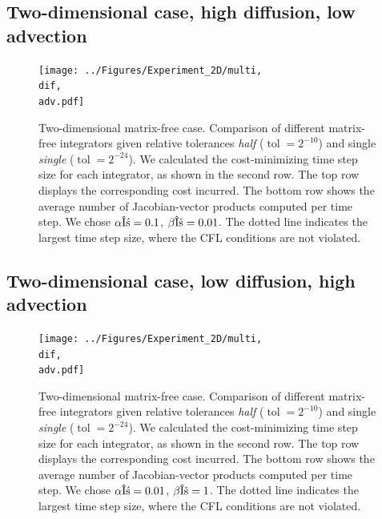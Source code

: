 \documentclass{scrartcl}
\begin{document}
\subsection*{Two-dimensional case, high diffusion, low advection}
\begin{figure}[H]
	\newcommand{\dif}{\detokenize{α}=0.1}
	\newcommand{\adv}{\detokenize{β}=0.01}
	\centering
	\texttt{[image: ../Figures/Experiment\_2D/multi, \\dif, \\adv.pdf]}
	\caption{Two-dimensional matrix-free case. Comparison of different matrix-free integrators given relative tolerances \textit{half} ($\operatorname{tol} = 2^{-10}$) and single \textit{single} ($\operatorname{tol} = 2^{-24}$). We calculated the cost-minimizing time step size for each integrator, as shown in the second row. The top row displays the corresponding cost incurred. The bottom row shows the average number of Jacobian-vector products computed per time step. We chose $\alpha\dif$, $\beta\adv$. The dotted line indicates the largest time step size, where the CFL conditions are not violated.}
	\label{fig:2DNonlinearHighPe}
\end{figure}

\subsection*{Two-dimensional case, low diffusion, high advection}
\begin{figure}[H]
	\newcommand{\dif}{\detokenize{α}=0.01}
	\newcommand{\adv}{\detokenize{β}=1}
	\centering
	\texttt{[image: ../Figures/Experiment\_2D/multi, \\dif, \\adv.pdf]}
	\caption{Two-dimensional matrix-free case. Comparison of different matrix-free integrators given relative tolerances \textit{half} ($\operatorname{tol} = 2^{-10}$) and single \textit{single} ($\operatorname{tol} = 2^{-24}$). We calculated the cost-minimizing time step size for each integrator, as shown in the second row. The top row displays the corresponding cost incurred. The bottom row shows the average number of Jacobian-vector products computed per time step. We chose $\alpha\dif$, $\beta\adv$. The dotted line indicates the largest time step size, where the CFL conditions are not violated.}
	\label{fig:2DNonlinearLowPe}
\end{figure}
\end{document}
